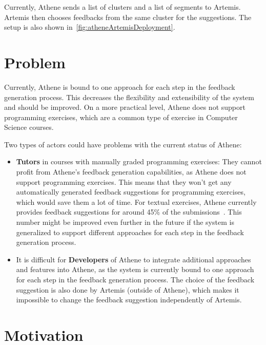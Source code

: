 Currently, Athene sends a list of clusters and a list of segments to Artemis. Artemis then chooses feedbacks from the same cluster for the suggestions. The setup is also shown in~\cref{fig:atheneArtemisDeployment}.


\section*{Problem}

Currently, Athene is bound to one approach for each step in the feedback generation process. This decreases the flexibility and extensibility of the system and should be improved.
On a more practical level, Athene does not support programming exercises, which are a common type of exercise in Computer Science courses.

Two types of actors could have problems with the current status of Athene:
\begin{itemize}
    \item \textbf{Tutors} in courses with manually graded programming exercises: They cannot profit from Athene's feedback generation capabilities, as Athene does not support programming exercises. This means that they won't get any automatically generated feedback suggestions for programming exercises, which would save them a lot of time.
    For textual exercises, Athene currently provides feedback suggestions for around 45\% of the submissions~\cite{cofee2}. This number might be improved even further in the future if the system is generalized to support different approaches for each step in the feedback generation process.
    \item It is difficult for \textbf{Developers} of Athene to integrate additional approaches and features into Athene, as the system is currently bound to one approach for each step in the feedback generation process. The choice of the feedback suggestion is also done by Artemis (outside of Athene), which makes it impossible to change the feedback suggestion independently of Artemis.
\end{itemize}

\section*{Motivation}

